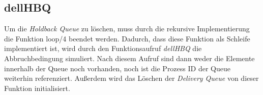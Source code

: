\subsection{dellHBQ}

Um die \textit{Holdback Queue} zu löschen, muss durch die rekursive Implementierung die Funktion loop/4 beendet werden. Dadurch, dass diese Funktion als Schleife implementiert ist, wird durch den Funktionsaufruf \textit{dellHBQ} die Abbruchbedingung simuliert. Nach diesem Aufruf sind dann weder die Elemente innerhalb der Queue noch vorhanden, noch ist die Prozess ID der Queue weiterhin referenziert. 
Außerdem wird das Löschen der \textit{Delivery Queue} von dieser Funktion initialisiert. 

